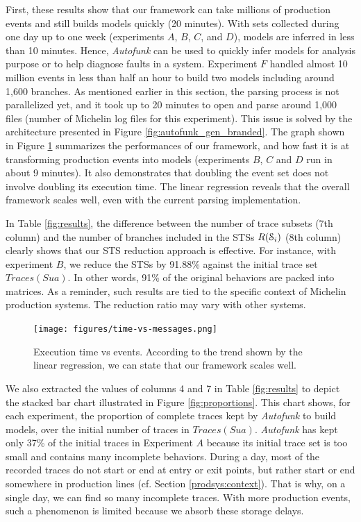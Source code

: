 First, these results show that our framework can take millions of
production events and still builds models quickly (20 minutes).
With sets collected during one day up to one week (experiments
$A$, $B$, $C$, and $D$), models are inferred in less than 10
minutes. Hence, \textit{Autofunk} can be used to quickly infer
models for analysis purpose or to help diagnose faults in a
system. Experiment $F$ handled almost 10 million events in less
than half an hour to build two models including around 1,600
branches. As mentioned earlier in this section, the parsing
process is not parallelized yet, and it took up to 20 minutes to
open and parse around 1,000 files (number of Michelin log files
for this experiment). This issue is solved by the architecture
presented in Figure \ref{fig:autofunk_gen_branded}.  The graph
shown in Figure \ref{fig:time-vs-messages} summarizes the
performances of our framework, and how fast it is at transforming
production events into models (experiments $B$, $C$ and $D$ run
in about 9 minutes). It also demonstrates that doubling the event
set does not involve doubling its execution time. The linear
regression reveals that the overall framework scales well, even
with the current parsing implementation.

In Table \ref{fig:results}, the difference between the number of
trace subsets (7th column) and the number of branches included in
the STSs $R(\EuScript{S}_i)$ (8th column) clearly shows that our
STS reduction approach is effective. For instance, with
experiment $B$, we reduce the STSs by 91.88\% against the initial
trace set $Traces(Sua)$. In other words, 91\% of the original
behaviors are packed into matrices. As a reminder, such results
are tied to the specific context of Michelin production systems.
The reduction ratio may vary with other systems.

\begin{figure}[ht]
  \texttt{[image: figures/time-vs-messages.png]}

  \caption{Execution time vs events. According to the trend shown
  by the linear regression, we can state that our framework
  scales well.}
  \label{fig:time-vs-messages}
\end{figure}

We also extracted the values of columns 4 and 7 in Table
\ref{fig:results} to depict the stacked bar chart illustrated in
Figure \ref{fig:proportions}. This chart shows, for each
experiment, the proportion of complete traces kept by
\textit{Autofunk} to build models, over the initial number of
traces in $Traces(Sua)$.  \textit{Autofunk} has kept only 37\% of
the initial traces in Experiment $A$ because its initial trace
set is too small and contains many incomplete behaviors. During a
day, most of the recorded traces do not start or end at entry or
exit points, but rather start or end somewhere in production
lines (cf. Section \ref{prodsys:context}). That is why, on a
single day, we can find so many incomplete traces. With more
production events, such a phenomenon is limited because we absorb
these storage delays.

